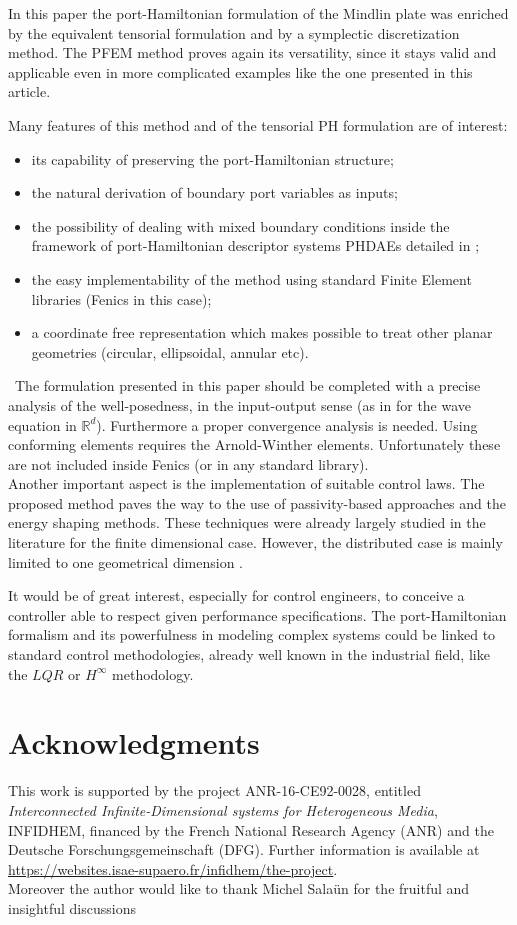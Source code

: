 \documentclass[preprint,12pt]{elsarticle}
\newcommand{\RevOne}[1]{\textcolor{blue!80!black}{#1}}
\begin{document}
In this paper the port-Hamiltonian formulation of the Mindlin plate was enriched by the equivalent tensorial formulation and by a symplectic discretization method. The PFEM method proves again its versatility, since it stays valid and applicable even in more complicated examples like the one presented in this article. \RevOne{Many features of this method and of the tensorial PH formulation are of interest:
\begin{itemize}
	\item its capability of preserving the port-Hamiltonian structure;
	\item the natural derivation of boundary port variables as inputs;
	\item the possibility of dealing with mixed boundary conditions inside the framework of  port-Hamiltonian descriptor systems PHDAEs  detailed in \cite{beattie2018linear};
	\item the easy implementability of the method using standard Finite Element libraries (Fenics \cite{LoggMardalEtAl2012} in this case);
	\item a coordinate free representation which makes possible to treat other planar geometries (circular, ellipsoidal, annular etc).
\end{itemize}  
\
The formulation presented in this paper should be completed with a precise analysis of the well-posedness, in the input-output sense (as in \cite{waveEqZwart} for the wave equation in $\mathbb{R}^d$). Furthermore a proper convergence analysis is needed. Using conforming elements requires the Arnold-Winther elements. Unfortunately these are not included inside Fenics (or in any standard library).  \\
Another important aspect is the implementation of suitable control laws. The proposed method paves the way to the use of passivity-based approaches and the energy shaping methods. These techniques were already largely studied in the literature \cite{Ortega2002, OrtegaContrInt} for the finite dimensional case. However, the distributed case is mainly limited to one geometrical dimension \cite{MaccContrDist}.}  It would be of great interest, especially for control engineers, to conceive a controller able to respect given performance specifications. The port-Hamiltonian formalism and its powerfulness in modeling complex systems could be linked to standard control methodologies, already well known in the industrial field, like the $LQR$ or $H^\infty$ methodology.   

\section*{Acknowledgments}
This work is  supported by the project ANR-16-CE92-0028,
entitled {\em Interconnected Infinite-Dimensional systems for Heterogeneous
Media}, INFIDHEM, financed by the French National
Research Agency (ANR) and the Deutsche Forschungsgemeinschaft (DFG).
Further information is available at {\url{https://websites.isae-supaero.fr/infidhem/the-project}}.  \\
Moreover the author would like to thank Michel Sala\"un for the fruitful and insightful discussions
   

 
\end{document}
